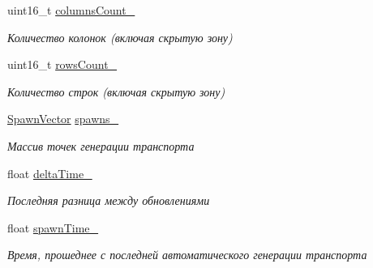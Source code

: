 \begin{DoxyCompactItemize}
uint16\+\_\+t \hyperlink{classrtm_1_1_world_controller_a7bfc27a0522b00d935d876cecba22462}{columns\+Count\+\_\+}
\begin{DoxyCompactList}\small\item\em Количество колонок (включая скрытую зону) \end{DoxyCompactList}\item 
\mbox{\label{classrtm_1_1_world_controller_a197d3d16ed426663acff8961c490ad90}} 
uint16\+\_\+t \hyperlink{classrtm_1_1_world_controller_a197d3d16ed426663acff8961c490ad90}{rows\+Count\+\_\+}
\begin{DoxyCompactList}\small\item\em Количество строк (включая скрытую зону) \end{DoxyCompactList}\item 
\mbox{\label{classrtm_1_1_world_controller_a1613bacd371babaf2ec98676dd3825b0}} 
\hyperlink{namespacertm_a9945e0a1add3159b49ccf7bad512ad70}{Spawn\+Vector} \hyperlink{classrtm_1_1_world_controller_a1613bacd371babaf2ec98676dd3825b0}{spawns\+\_\+}
\begin{DoxyCompactList}\small\item\em Массив точек генерации транспорта \end{DoxyCompactList}\item 
\mbox{\label{classrtm_1_1_world_controller_a9001de7c6700848e46213028697da9cc}} 
float \hyperlink{classrtm_1_1_world_controller_a9001de7c6700848e46213028697da9cc}{delta\+Time\+\_\+}
\begin{DoxyCompactList}\small\item\em Последняя разница между обновлениями \end{DoxyCompactList}\item 
\mbox{\label{classrtm_1_1_world_controller_af7d55257bbc082e99ba262e3af446484}} 
float \hyperlink{classrtm_1_1_world_controller_af7d55257bbc082e99ba262e3af446484}{spawn\+Time\+\_\+}
\begin{DoxyCompactList}\small\item\em Время, прошеднее с последней автоматического генерации транспорта \end{DoxyCompactList}\item 
\mbox{\label{classrtm_1_1_world_controller_adf27005742c62e45a779ef60db6c3ab9}} 

\end{DoxyCompactItemize}

